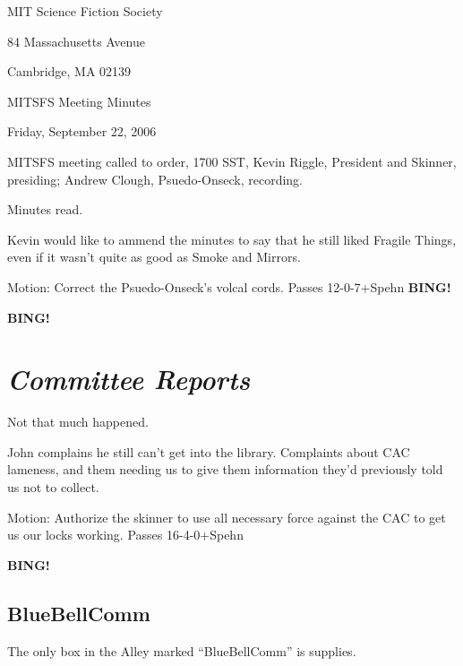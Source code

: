 \documentclass[10pt]{article}
\newcommand{\bing}{{\bf BING!} }
\newcommand{\goto}[1]{\bing \vskip 12pt \section*{{\em{#1}}}}
\begin{document}
\begin{center}

MIT Science Fiction Society

84 Massachusetts Avenue

Cambridge, MA 02139

\vspace{12pt}

MITSFS Meeting Minutes

Friday, September 22, 2006


\end{center}

\vspace{18pt}

\setlength{\parskip}{6pt}

\noindent
MITSFS meeting called to order, 1700 SST,
Kevin Riggle, President and Skinner, presiding; Andrew Clough, Psuedo-Onseck, recording.

Minutes read.

Kevin would like to ammend the minutes to say that he still liked Fragile Things, even if it wasn't quite as good as Smoke and Mirrors.

Motion:  Correct the Psuedo-Onseck's volcal cords. Passes 12-0-7+Spehn
\bing

\goto{Committee Reports}

Not that much happened.

John complains he still can't get into the library.  Complaints about CAC lameness, and them needing us to give them information they'd previously told us not to collect.

Motion:  Authorize the skinner to use all necessary force against the CAC to get us our locks working.  Passes 16-4-0+Spehn

\bing

\subsection*{BlueBellComm}

The only box in the Alley marked ``BlueBellComm'' is supplies.


\end{document}
